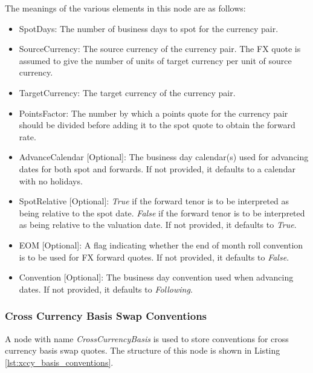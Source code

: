 The meanings of the various elements in this node are as follows:
\begin{itemize}
\item SpotDays: The number of business days to spot for the currency pair.
\item SourceCurrency: The source currency of the currency pair. The FX quote is assumed to give the number of units of
target currency per unit of source currency.
\item TargetCurrency: The target currency of the currency pair.
\item PointsFactor: The number by which a points quote for the currency pair should be divided before adding it to the
spot quote to obtain the forward rate.
\item AdvanceCalendar [Optional]: The business day calendar(s) used for advancing dates for both spot and forwards. If
not provided, it defaults to a calendar with no holidays.
\item SpotRelative [Optional]: \emph{True} if the forward tenor is to be interpreted as being relative to the spot date.
\emph{False} if the forward tenor is to be interpreted as being relative to the valuation date. If not provided, it
defaults to \emph{True}.
\item EOM [Optional]: A flag indicating whether the end of month roll convention is to be used for FX forward quotes. If not provided, it defaults to \emph{False}.
\item Convention [Optional]: The business day convention used when advancing dates. If not provided, it defaults to \emph{Following}.
\end{itemize}

\subsubsection{Cross Currency Basis Swap Conventions}
A node with name \emph{CrossCurrencyBasis} is used to store conventions for cross currency basis swap quotes. The
structure of this node is shown in Listing \ref{lst:xccy_basis_conventions}.

